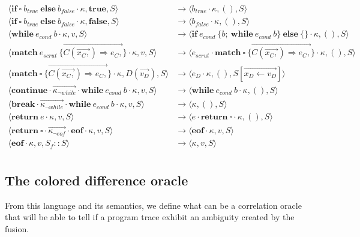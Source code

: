 \documentclass[a4paper,11pt]{article}
\newcommand\rtstate[3]{\langle #1, #2, #3\rangle}
\begin{document}
\begin{align*}
\rtstate{\mathbf{if}\ \square\ b_{true}\ \mathbf{else}\ b_{false} \cdot  \kappa}{\mathbf{true}}{S} &\rightarrow \rtstate{b_{true} \cdot \kappa}{()}{S}\\
\rtstate{\mathbf{if}\ \square\ b_{true}\ \mathbf{else}\ b_{false} \cdot  \kappa}{\mathbf{false}}{S} &\rightarrow \rtstate{b_{false} \cdot \kappa}{()}{S}\\
\rtstate{\mathbf{while}\ e_{cond}\ b \cdot \kappa}{v}{S} &\rightarrow \rtstate{\mathbf{if}\ e_{cond}\ \{ b;\ \mathbf{while}\ e_{cond}\ b \}\  \mathbf{else}\ \{\} \cdot \kappa}{()}{S}\\
\rtstate{\mathbf{match}\ e_{scrut}\ \{ \overrightarrow{C(\overrightarrow{x_C,}) \Rightarrow e_C,} \} \cdot \kappa}{v}{S} &\rightarrow \rtstate{e_{scrut} \cdot \mathbf{match}\ \square\ \{ \overrightarrow{C(\overrightarrow{x_C,}) \Rightarrow e_C,} \} \cdot \kappa}{()}{S}\\
\rtstate{\mathbf{match}\ \square\ \{ \overrightarrow{C(\overrightarrow{x_C,}) \Rightarrow e_C,} \} \cdot \kappa}{D(\overrightarrow{v_D})}{S} &\rightarrow \rtstate{e_D \cdot \kappa}{()}{S[\overrightarrow{x_D \leftarrow v_D}]}\\
\rtstate{\mathbf{continue} \cdot \overrightarrow{\kappa_{\neg while}} \cdot \textbf{while}\ e_{cond}\ b \cdot \kappa}{v}{S} &\rightarrow \rtstate{\textbf{while}\ e_{cond}\ b \cdot \kappa}{()}{S}\\
\rtstate{\mathbf{break} \cdot \overrightarrow{\kappa_{\neg while}} \cdot \textbf{while}\ e_{cond}\ b \cdot \kappa}{v}{S} &\rightarrow \rtstate{\kappa}{()}{S}\\
\rtstate{\mathbf{return}\ e \cdot \kappa}{v}{S} &\rightarrow \rtstate{e \cdot \mathbf{return}\ \square \cdot \kappa}{()}{S}\\
\rtstate{\mathbf{return}\ \square \cdot \overrightarrow{\kappa_{\neg eof}} \cdot \textbf{eof} \cdot \kappa}{v}{S} &\rightarrow \rtstate{\textbf{eof} \cdot \kappa}{v}{S}\\
\rtstate{\textbf{eof} \cdot \kappa}{v}{S_f :: S} &\rightarrow \rtstate{\kappa}{v}{S}\\
\end{align*}

\subsection{The colored difference oracle}
\label{sec:colored-diff-oracle}
From this language and its semantics, we define what can be a correlation oracle that will be able to tell if a program trace exhibit an ambiguity created by the fusion.
\end{document}
